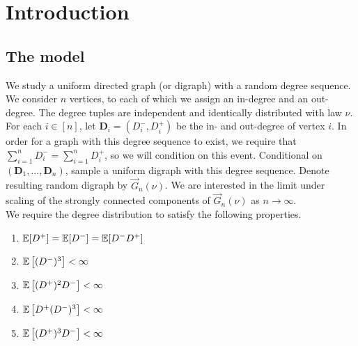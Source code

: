 \section{Introduction}



\subsection{The model}
We study a uniform directed graph (or digraph) with a random degree sequence. We consider $n$ vertices, to each of which we assign an in-degree and an out-degree. The degree tuples are independent and identically distributed with law $\nu$. For each $i\in [n]$, let $\mathbf{D}_i=(D^-_i,D^+_i)$ be the in- and out-degree of vertex $i$. In order for a graph with this degree sequence to exist, we require that $\sum_{i=1}^n D^-_i=\sum_{i=1}^n D^+_i$, so we will condition on this event. Conditional on $(\mathbf{D}_1,\dots,\mathbf{D}_n)$, sample a uniform digraph with this degree sequence. Denote resulting random digraph by $\vec{G}_n(\nu)$. We are interested in the limit under scaling of the strongly connected components of $\vec{G}_n(\nu)$ as $n\to \infty$.  \\

We require the degree distribution to satisfy the following properties.


\begin{enumerate}
    \item \label{cond.mu}${\mathbb E}[D^+]={\mathbb E}[D^-]={\mathbb E}[D^-D^+]$
     \item \label{cond.gamma}${\mathbb E}\left[(D^-)^3\right]<\infty$
    \item \label{cond.rho} ${\mathbb E}\left[(D^+)^2 D^-\right]<\infty$
      \item \label{cond.iota} ${\mathbb E}\left[D^+(D^-)^3\right]<\infty$
      \item ${\mathbb E}\left[(D^+)^3D^-\right]<\infty$
\end{enumerate}

